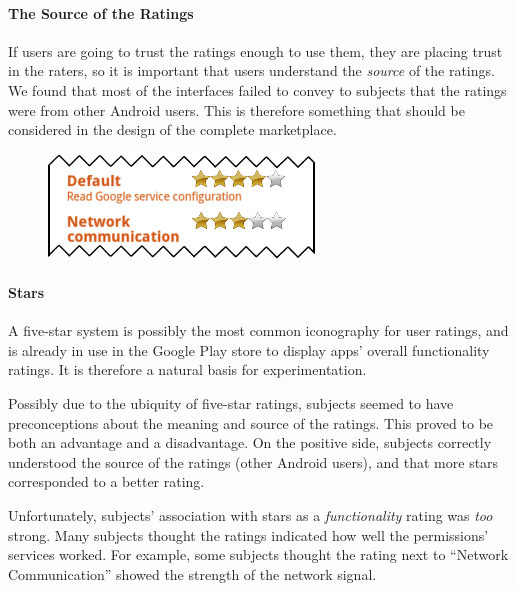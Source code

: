 \documentclass[11pt]{article}
\begin{document}
\paragraph{The Source of the Ratings}
\label{subsec-small-source}

If users are going to trust the ratings enough to use them, 
they are placing trust in the raters, so it is
important that users understand the \emph{source}
of the ratings. 
We found that most of the interfaces failed to
convey to subjects that the ratings were from other Android users.
This is therefore something that should be considered in the 
design of the complete marketplace.

\label{ss-sec-stars-r1}
\begin{figure}
\begin{center}
\includegraphics[width=.9\linewidth]{candidate-img/stars/starsR1.png}
\end{center}
\end{figure}

\paragraph{Stars}
\label{s-sec-stars}

A five-star system is possibly the most common iconography for user ratings,
and is already in use in the Google Play store to display apps' overall 
functionality ratings. It is therefore a natural basis for experimentation.



Possibly due to the ubiquity of five-star ratings, 
subjects seemed to have preconceptions 
about the meaning and source of the ratings. This proved to be both an 
advantage and a disadvantage. On the positive side, 
subjects correctly understood the source of
the ratings (other Android users), and that more stars corresponded to a 
better rating.

Unfortunately, subjects' association with stars as a \emph{functionality} rating 
was \emph{too} strong. Many subjects thought the ratings indicated how well 
the permissions' services worked. For example, some subjects thought the rating next 
to ``Network Communication'' showed the strength of the network signal. 
\end{document}
